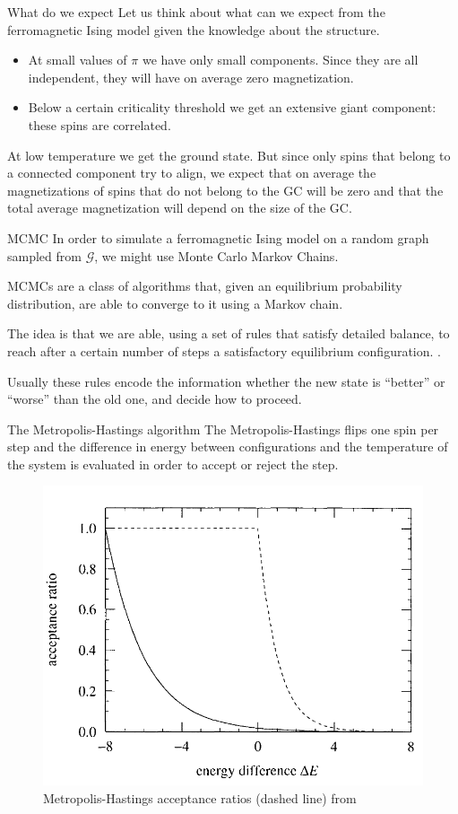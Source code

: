 \documentclass[handout]{beamer}
\begin{document}
\begin{frame}{What do we expect}
    Let us think about what can we expect from the ferromagnetic Ising model
    given the knowledge about the structure.

    \begin{itemize}
        \item At small values of $\pi$ we have only small components. Since
            they are \alert{all independent}, they will have on average zero
            magnetization.
        \item Below a certain criticality threshold we get an extensive giant
            component: these spins are correlated.
    \end{itemize}

    At low temperature we get the ground state. But since only spins that belong
    to a connected component try to align, we expect that on average the
    magnetizations of spins that do not belong to the GC will be zero and that
    the total average magnetization will depend on the size of the GC.
\end{frame}

\begin{frame}{MCMC}
    In order to simulate a ferromagnetic Ising model on a random graph sampled
    from $\mathcal{G}$, we might use \alert{Monte Carlo Markov Chains}.

    MCMCs are a class of algorithms that, given an equilibrium probability
    distribution, are able to converge to it using a Markov chain.

    The idea is that we are able, using a set of rules that satisfy detailed
    balance, to reach after a certain number of steps a satisfactory
    equilibrium configuration. \cite[31-42]{newman_barkema}.

    Usually these rules encode the information whether the new state is
    ``better'' or ``worse'' than the old one, and decide how to proceed.
\end{frame}

\begin{frame}{The Metropolis-Hastings algorithm}
    The \alert{Metropolis-Hastings} flips one spin per step and the difference
    in energy between configurations and the temperature of the system is
    evaluated in order to accept or reject the step. \cite[46]{newman_barkema}

    \begin{figure}
        \centering
        \includegraphics[width=.4\textwidth]{metropolis_acceptance.png}
        \caption{Metropolis-Hastings acceptance ratios (dashed line) from
        \cite[48]{newman_barkema}}
    \end{figure}
\end{frame}
\end{document}
